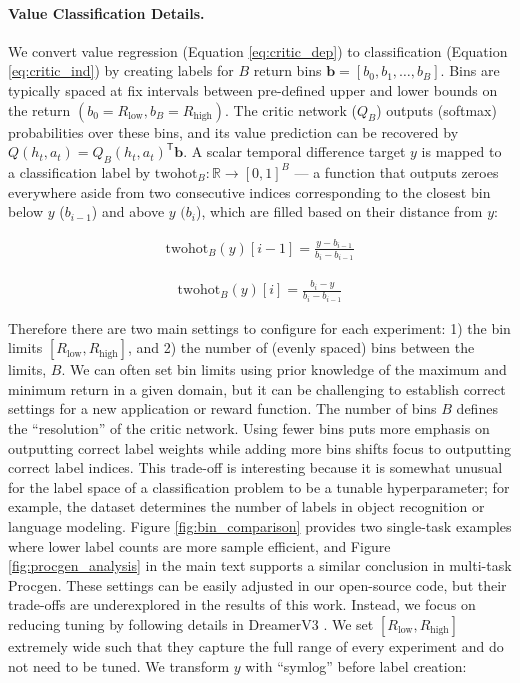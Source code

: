 \documentclass{article}
\begin{document}
\paragraph{Value Classification Details.} We convert value regression (Equation \ref{eq:critic_dep}) to classification (Equation \ref{eq:critic_ind}) by creating labels for $B$ return bins $\mathbf{b} = [b_0, b_1, \dots, b_B]$. Bins are typically spaced at fix intervals between pre-defined upper and lower bounds on the return $(b_0 = R_\text{low}, b_B = R_\text{high})$. The critic network ($Q_B$) outputs (softmax) probabilities over these bins, and its value prediction can be recovered by $Q(h_t, a_t) = Q_B(h_t, a_t)^\mathsf{T}\mathbf{b} $.  A scalar temporal difference target $y$ is mapped to a classification label by $\text{twohot}_B: \mathbb{R} \rightarrow [0, 1]^{B}$ --- a function that outputs zeroes everywhere aside from two consecutive indices corresponding to the closest bin below $y$ ($b_{i-1}$) and above $y$ $(b_{i}$), which are filled based on their distance from $y$:
\begin{minipage}{0.45\textwidth}
  \begin{align}
    \text{twohot}_B(y)[i-1] = \frac{y - b_{i-1}}{b_i - b_{i-1}}
    \end{align}
\end{minipage}
\begin{minipage}{0.45\textwidth}
    \begin{align}
    \text{twohot}_B(y)[i] = \frac{b_{i} - y}{b_i - b_{i-1}}
    \end{align}
\end{minipage}
Therefore there are two main settings to configure for each experiment: 1) the bin limits $[R_\text{low}, R_\text{high}]$, and 2) the number of (evenly spaced) bins between the limits, $B$. We can often set bin limits using prior knowledge of the maximum and minimum return in a given domain, but it can be challenging to establish correct settings for a new application or reward function. The number of bins $B$ defines the ``resolution'' of the critic network. Using fewer bins puts more emphasis on outputting correct label weights while adding more bins shifts focus to outputting correct label indices. This trade-off is interesting because it is somewhat unusual for the label space of a classification problem to be a tunable hyperparameter; for example, the dataset determines the number of labels in object recognition or language modeling. Figure \ref{fig:bin_comparison} provides two single-task examples where lower label counts are more sample efficient, and Figure \ref{fig:procgen_analysis} in the main text supports a similar conclusion in multi-task Procgen. These settings can be easily adjusted in our open-source code, but their trade-offs are underexplored in the results of this work. Instead, we focus on reducing tuning by following details in DreamerV3 \cite{hafner2023mastering}. We set $[R_\text{low}, R_\text{high}]$ extremely wide such that they capture the full range of every experiment and do not need to be tuned. We transform $y$ with ``symlog'' before label creation:
\end{document}
